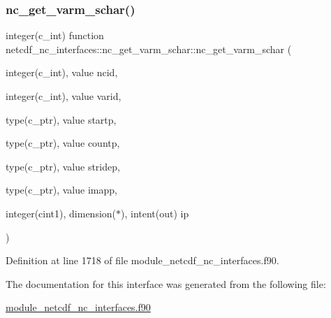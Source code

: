 \subsubsection{\texorpdfstring{nc\+\_\+get\+\_\+varm\+\_\+schar()}{nc\_get\_varm\_schar()}}
{\footnotesize\ttfamily integer(c\+\_\+int) function netcdf\+\_\+nc\+\_\+interfaces\+::nc\+\_\+get\+\_\+varm\+\_\+schar\+::nc\+\_\+get\+\_\+varm\+\_\+schar (\begin{DoxyParamCaption}\item[{integer(c\+\_\+int), value}]{ncid,  }\item[{integer(c\+\_\+int), value}]{varid,  }\item[{type(c\+\_\+ptr), value}]{startp,  }\item[{type(c\+\_\+ptr), value}]{countp,  }\item[{type(c\+\_\+ptr), value}]{stridep,  }\item[{type(c\+\_\+ptr), value}]{imapp,  }\item[{integer(cint1), dimension($\ast$), intent(out)}]{ip }\end{DoxyParamCaption})}



Definition at line 1718 of file module\+\_\+netcdf\+\_\+nc\+\_\+interfaces.\+f90.



The documentation for this interface was generated from the following file\+:\begin{DoxyCompactItemize}
\item 
\hyperlink{module__netcdf__nc__interfaces_8f90}{module\+\_\+netcdf\+\_\+nc\+\_\+interfaces.\+f90}\end{DoxyCompactItemize}
